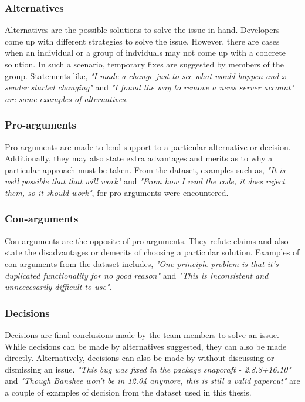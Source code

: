 \documentclass[a4paper,12pt,twoside]{report}
\begin{document}
\subsubsection{Alternatives}
Alternatives are the possible solutions to solve the issue in hand. Developers come up with different strategies to solve the issue. However, there are cases when an individual or a group of indviduals may not come up with a concrete solution. In such a scenario, temporary fixes are suggested by members of the group. Statements like, \textit{"I made a change just to see what would happen and x-sender started changing"} and \textit{"I found the way to remove a news server account" are some examples of alternatives.}

\subsubsection{Pro-arguments}
Pro-arguments are made to lend support to a particular alternative or decision. Additionally, they may also state extra advantages and merits as to why a particular approach must be taken. From the dataset, examples such as, \textit{"It is well possible that that will work"} and \textit{"From how I read the code, it does reject them, so it should work"}, for pro-arguments were encountered. 

\subsubsection{Con-arguments}
Con-arguments are the opposite of pro-arguments. They refute claims and also state the disadvantages or demerits of choosing a particular solution. Examples of con-arguments from the dataset includes, \textit{"One principle problem is that it's duplicated functionality for no good reason"} and \textit{"This is inconsistent and unneccesarily difficult to use".}

\subsubsection{Decisions}
Decisions are final conclusions made by the team members to solve an issue. While decisions can be made by alternatives suggested, they can also be made directly. Alternatively, decisions can also be made by without discussing or dismissing an issue. \textit{"This bug was fixed in the package snapcraft - 2.8.8+16.10"} and \textit{"Though Banshee won't be in 12.04 anymore, this is still a valid papercut"} are a couple of examples of decision from the dataset used in this thesis.
\end{document}
